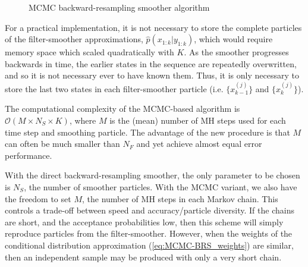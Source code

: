 \documentclass[10pt,twocolumn,twoside]{IEEEtran}
\begin{document}
\begin{figure}
\caption{MCMC backward-resampling smoother algorithm}
\label{alg:MCMC-BRS}
\end{figure}

For a practical implementation, it is not necessary to store the complete particles of the filter-smoother approximations, $\hat{p}(x_{1:k}|y_{1:k})$, which would require memory space which scaled quadratically with $K$. As the smoother progresses backwards in time, the earlier states in the sequence are repeatedly overwritten, and so it is not necessary ever to have known them. Thus, it is only necessary to store the last two states in each filter-smoother particle (i.e. $\{x_{k-1}^{(j)}\}$ and $\{x_{k}^{(j)}\}$).

The computational complexity of the MCMC-based algorithm is $\mathcal{O}(M \times N_S \times K)$, where $M$ is the (mean) number of MH steps used for each time step and smoothing particle. The advantage of the new procedure is that $M$ can often be much smaller than $N_F$ and yet achieve almost equal error performance.

With the direct backward-resampling smoother, the only parameter to be chosen is $N_S$, the number of smoother particles. With the MCMC variant, we also have the freedom to set $M$, the number of MH steps in each Markov chain. This controls a trade-off between speed and accuracy/particle diversity. If the chains are short, and the acceptance probabilities low, then this scheme will simply reproduce particles from the filter-smoother. However, when the weights of the conditional distribution approximation (\ref{eq:MCMC-BRS_weights}) are similar, then an independent sample may be produced with only a very short chain.
\end{document}
